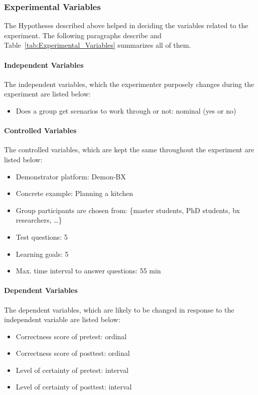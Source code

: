 \subsubsection{Experimental Variables}\label{subsubsec:expvariables}
The Hypotheses described above helped in deciding the variables related to the experiment. The following paragraphs describe and Table~\ref{tab:Experimental_Variables} summarizes all of them.

\paragraph{Independent Variables} The independent variables, which the experimenter purposely changes during the experiment are listed below:

\begin{itemize}
	\item Does a group get scenarios to work through or not: nominal (yes or no)
\end{itemize}

\paragraph{Controlled Variables} The controlled variables, which are kept the same throughout the experiment are listed below:

\begin{itemize}
	\item Demonstrator platform: Demon-BX
	\item Concrete example: Planning a kitchen
	\item Group participants are chosen from: \{master students, PhD students, bx researchers, \ldots \}
	\item Test questions: 5
	\item Learning goals: 5
	\item Max. time interval to answer questions: 55 min
\end{itemize}

\paragraph{Dependent Variables} The dependent variables, which are likely to be changed in response to the independent variable are listed below:

\begin{itemize}
  \item Correctness score of pretest: ordinal
  \item Correctness score of posttest: ordinal
  \item Level of certainty of pretest:  interval
  \item Level of certainty of posttest: interval
\end{itemize}

